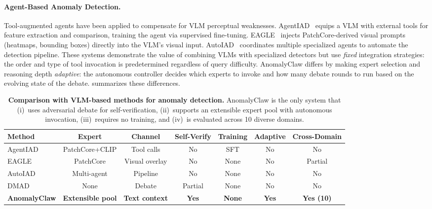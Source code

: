 \paragraph{Agent-Based Anomaly Detection.}
Tool-augmented agents have been applied to compensate for VLM perceptual weaknesses.
AgentIAD~\citep{zhang2025agentiad} equips a VLM with external tools for feature extraction and comparison, training the agent via supervised fine-tuning.
EAGLE~\citep{chen2026eagle} injects PatchCore-derived visual prompts (heatmaps, bounding boxes) directly into the VLM's visual input.
AutoIAD~\citep{wei2025autoiad} coordinates multiple specialized agents to automate the detection pipeline.
These systems demonstrate the value of combining VLMs with specialized detectors but use \emph{fixed} integration strategies: the order and type of tool invocation is predetermined regardless of query difficulty.
AnomalyClaw differs by making expert selection and reasoning depth \emph{adaptive}: the autonomous controller decides which experts to invoke and how many debate rounds to run based on the evolving state of the debate.
 summarizes these differences.

\begin{table}[t]
\centering
\caption{%
    \textbf{Comparison with VLM-based methods for anomaly detection.}
    AnomalyClaw is the only system that (i)~uses adversarial debate for self-verification, (ii)~supports an extensible expert pool with autonomous invocation, (iii)~requires no training, and (iv)~is evaluated across 10 diverse domains.
}
\label{tab:related_comparison}
\small
\setlength{\tabcolsep}{2.8pt}
\begin{tabular}{@{}lcccccc@{}}
\toprule
Method & Expert & Channel & Self-Verify & Training & Adaptive & Cross-Domain \\
\midrule
AgentIAD~\citeyear{zhang2025agentiad}  & PatchCore+CLIP & Tool calls & No & SFT & No & No \\
EAGLE~\citeyear{chen2026eagle}         & PatchCore & Visual overlay & No & None & No & Partial \\
AutoIAD~\citeyear{wei2025autoiad}      & Multi-agent & Pipeline & No & None & No & No \\
DMAD~\citeyear{li2025dmad}             & None & Debate & Partial & None & No & No \\
\textbf{AnomalyClaw}  & \textbf{Extensible pool} & \textbf{Text context} & \textbf{Yes} & \textbf{None} & \textbf{Yes} & \textbf{Yes (10)} \\
\bottomrule
\end{tabular}
\end{table}

